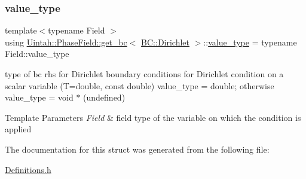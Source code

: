 \subsubsection{\texorpdfstring{value\+\_\+type}{value\_type}}
{\footnotesize\ttfamily template$<$typename Field $>$ \\
using \hyperlink{structUintah_1_1PhaseField_1_1get__bc}{Uintah\+::\+Phase\+Field\+::get\+\_\+bc}$<$ \hyperlink{namespaceUintah_1_1PhaseField_a148fba372aa3be96fd6eede7a2fa10b5abac152b762896edff34ed668ae1a546f}{B\+C\+::\+Dirichlet} $>$\+::\hyperlink{structUintah_1_1PhaseField_1_1get__bc_3_01BC_1_1Dirichlet_01_4_ae1c15db2b127eed1a3216daeda3a338c}{value\+\_\+type} =  typename Field\+::value\+\_\+type}



type of bc rhs for Dirichlet boundary conditions for Dirichlet condition on a scalar variable (T=double, const double) value\+\_\+type = double; otherwise value\+\_\+type = void $\ast$ (undefined) 


\begin{DoxyTemplParams}{Template Parameters}
{\em Field} & field type of the variable on which the condition is applied \\
\hline
\end{DoxyTemplParams}


The documentation for this struct was generated from the following file\+:\begin{DoxyCompactItemize}
\item 
\hyperlink{Definitions_8h}{Definitions.\+h}\end{DoxyCompactItemize}
